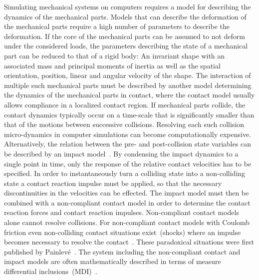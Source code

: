 \documentclass[global,twocolumn]{svjour}
\begin{document}
		Simulating mechanical systems on computers requires a model for describing the dynamics of the mechanical parts.
		Models that can describe the deformation of the mechanical parts require a high number of parameters to
		describe the deformation. If the core of the mechanical parts can be assumed to not deform under the considered
		loads, the parameters describing the state of a mechanical part can be reduced to that of a rigid body: An
		invariant shape with an associated mass and principal moments of inertia as well as the spatial orientation, position, linear and angular velocity of
		the shape. The interaction of multiple such mechanical parts must be described by another model determining the
		dynamics of the mechanical parts in contact, where the contact model usually allows compliance in a localized
		contact region. If mechanical parts collide, the contact dynamics typically occur on a time-scale that is
		significantly smaller than that of the motions between successive collisions. Resolving each such collision
		micro-dynamics in computer simulations can become computationally expensive.
		Alternatively, the relation between the pre- and post-collision state variables can be described by an impact
		model~\cite{stronge04}. By condensing the impact dynamics to a single point in time, only the response
		of the relative contact velocities has to be specified. In order to instantaneously turn a colliding state
		into a non-colliding state a contact reaction impulse must be applied, so that the necessary
		discontinuities in the velocities can be effected. The impact model must then be combined with a non-compliant
		contact model in order to determine the contact reaction forces and contact reaction impulses.
		Non-compliant contact models alone cannot resolve collisions. For non-compliant contact models with Coulomb
		friction even non-colliding contact situations exist~(shocks) where an impulse becomes necessary to resolve
		the contact~\cite{stewart00}. These paradoxical situations were first published by Painlev\'{e}~\cite{painleve1895}.
		The system including the non-compliant contact and impact models are often mathematically described in terms of
		measure differential inclusions~(MDI)~\cite{moreau88}.
\end{document}
